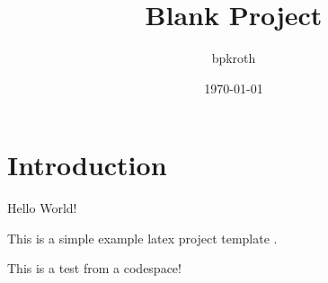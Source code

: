 \documentclass{article}
\title{Blank Project}
\author{bpkroth}
\date{\today}
\begin{document}
\maketitle

\section{Introduction}

Hello World!

This is a simple example latex project template \cite{latex-project-template}.

This is a test from a codespace!



\end{document}
